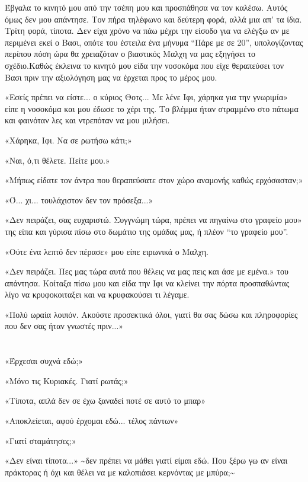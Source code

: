 \documentclass[12pt,twoside, openany]{book}
\begin{document}
Έβγαλα το κινητό μου από την τσέπη μου και προσπάθησα να τον καλέσω. Αυτός όμως δεν μου απάντησε. Τον πήρα τηλέφωνο και δεύτερη φορά, αλλά μια απ’ τα ίδια. Τρίτη φορά, τίποτα. Δεν είχα χρόνο να πάω μέχρι την είσοδο για να ελέγξω αν με περιμένει εκεί ο Βασι, οπότε του έστειλα ένα μήνυμα “Πάρε με σε 20”, υπολογίζοντας περίπου πόση ώρα θα χρειαζόταν ο βιαστικός Μαλχη να μας εξηγήσει το σχέδιο.Καθώς έκλεινα το κινητό μου είδα την νοσοκόμα που είχε θεραπεύσει τον Βασι πριν την αξιολόγηση μας να έρχεται προς το μέρος μου. 

«Εσείς πρέπει να είστε... ο κύριος Θοτς... Με λένε Ιφι, χάρηκα για την γνωριμία» είπε η νοσοκόμα και μου έδωσε το χέρι της. Το βλέμμα ήταν στραμμένο στο πάτωμα και φαινόταν λες και ντρεπόταν να μου μιλήσει.

«Χάρηκα, Ιφι. Να σε ρωτήσω κάτι;»

«Ναι, ό,τι θέλετε. Πείτε μου.»

«Μήπως είδατε τον άντρα που θεραπεύσατε στον χώρο αναμονής καθώς ερχόσασταν;»

«Ό... χι... τουλάχιστον δεν τον πρόσεξα...»

«Δεν πειράζει, σας ευχαριστώ. Συγγνώμη τώρα, πρέπει να πηγαίνω στο γραφείο μου» της είπα και γύρισα πίσω στο δωμάτιο της ομάδας μας, ή πλέον “το γραφείο μου”.

«Ούτε ένα λεπτό δεν πέρασε» μου είπε ειρωνικά ο Μαλχη.

«Δεν πειράζει. Πες μας τώρα αυτά που θέλεις να μας πεις και άσε με εμένα.» του απάντησα. Κοίταξα πίσω μου και είδα την Ιφι να κλείνει την πόρτα προσπαθώντας λίγο να κρυφοκοιταξει και να κρυφακούσει τι λέγαμε.

«Πολύ ωραία λοιπόν. Ακούστε προσεκτικά όλοι, γιατί θα σας δώσω και πληροφορίες που δεν σας ήταν γνωστές πριν...»

\chapter{}

«Έρχεσαι συχνά εδώ;»

«Μόνο τις Κυριακές. Γιατί ρωτάς;»

«Τίποτα, απλά δεν σε έχω ξαναδεί ποτέ σε αυτό το μπαρ»

«Αποκλείεται, αφού έρχομαι εδώ... τέλος πάντων»

«Γιατί σταμάτησες;»

«Δεν είναι τίποτα...» \textasciitilde δεν πρέπει να μάθει γιατί είμαι εδώ. Που ξέρω γω αν είναι πράκτορας ή όχι και θέλει να με καλοπιάσει κερνόντας με μπύρα;\textasciitilde 
\end{document}
